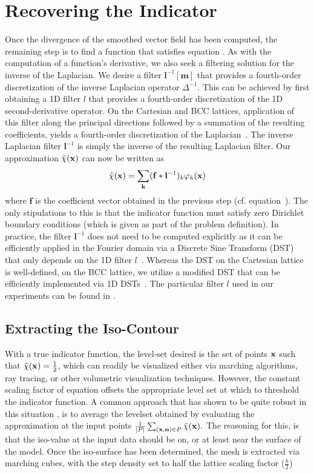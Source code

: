 \section{Recovering the Indicator}

\label{sec:recoveringX}
Once the divergence of the smoothed vector field has been computed, the remaining step is to find a function that satisfies equation . As with the computation of a function's derivative, we also seek a filtering solution for the inverse of the Laplacian. We desire a filter $\mathbf{l}^{-1}[\mathbf{m}]$ that provides a fourth-order discretization of the inverse Laplacian operator $\Delta^{-1}$. This can be achieved by first obtaining a 1D filter $l$ that provides a fourth-order discretization of the 1D second-derivative operator. On the Cartesian and BCC lattices, application of this filter along the principal directions followed by a summation of the resulting coefficients, yields a fourth-order discretization of the Laplacian~\cite{usmanthesis}. The inverse Laplacian filter $\mathbf{l}^{-1}$ is simply the inverse of the resulting Laplacian filter. Our approximation $\tilde{\chi}(\mathbf{x})$ can now be written as {\small
\begin{equation}
	\tilde{\chi}(\mathbf{x})  = \displaystyle\sum_{\mathbf{k}} (\mathbf{f} \ast \mathbf{l}^{-1})_k\varphi_k(\mathbf{x})
\end{equation}}
where $\mathbf{f}$ is the coefficient vector obtained in the previous step (cf. equation~). The only stipulations to this is that the indicator function must satisfy zero Dirichlet boundary conditions (which is given as part of the problem definition). In practice, the filter $\mathbf{l}^{-1}$ does not need to be computed explicitly as it can be efficiently applied in the Fourier domain via a Discrete Sine Transform (DST) that only depends on the 1D filter $l$~\cite[Chapter 4]{usmanthesis}. Whereas the DST on the Cartesian lattice is well-defined, on the BCC lattice, we utilize a  modified DST that can be efficiently implemented via 1D DSTs~\cite{bccdst}. The particular filter $l$ used in our experiments can be found in .

\subsection{Extracting the Iso-Contour}\label{sec:levelset}
With a true indicator function, the level-set desired is the set of points $\mathbf{x}$ such that $\tilde{\chi}(\mathbf{x}) = \frac{1}{2}$, which can readily be visualized either via marching algorithms, ray tracing, or other volumetric visualization techniques. However, the constant scaling factor of equation  offsets the appropriate level set at which to threshold the indicator function. A common approach that has shown to be quite robust in this situation \cite{fftk}, is to average the levelset obtained by evaluating the approximation at the input points $\frac{1}{|P|}\sum_{(\mathbf{x},\mathbf{n})\in P}{\tilde{\chi}(\mathbf{x})}.$ The reasoning for this, is that the iso-value at the input data should be on, or at least near the surface of the model. Once the iso-surface has been determined, the mesh is extracted via marching cubes, with the step density set to half the lattice scaling factor ($\frac{h}{2}$) \cite{}
